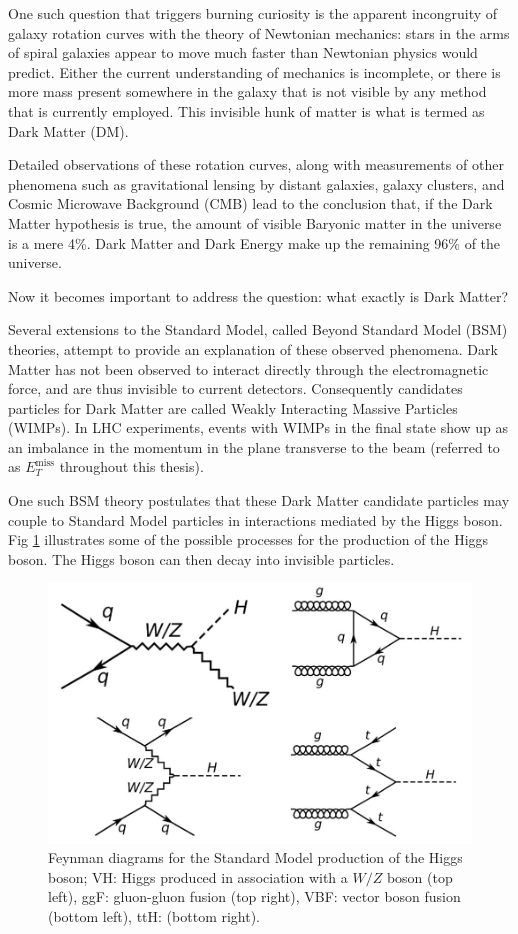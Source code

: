 \documentclass[12pt,a4paper,openright,twoside]{report}
\newcommand{\met}{$E_T^{\mathrm{miss}}$ }
\begin{document}
One such question that triggers burning curiosity is the apparent incongruity of galaxy rotation curves with the theory of Newtonian mechanics: stars in the arms of spiral galaxies appear to move much faster than Newtonian physics would predict. Either the current understanding of mechanics is incomplete, or there is more mass present somewhere in the galaxy that is not visible by any method that is currently employed. This invisible hunk of matter is what is termed as Dark Matter (DM).

Detailed observations of these rotation curves, along with measurements of other phenomena such as gravitational lensing by distant galaxies, galaxy clusters, and Cosmic Microwave Background (CMB) lead to the conclusion that, if the Dark Matter hypothesis is true, the amount of visible Baryonic matter in the universe is a mere 4\%. Dark Matter and Dark Energy make up the remaining 96\% of the universe.

Now it becomes important to address the question: what exactly is Dark Matter? 

Several extensions to the Standard Model, called Beyond Standard Model (BSM) theories, attempt to provide an explanation of these observed phenomena. Dark Matter has not been observed to interact directly through the electromagnetic force, and are thus invisible to current detectors. Consequently candidates particles for Dark Matter are called Weakly Interacting Massive Particles (WIMPs). In LHC experiments, events with WIMPs in the final state show up as an imbalance in the momentum in the plane transverse to the beam (referred to as \met throughout this thesis).

One such BSM theory postulates that these Dark Matter candidate particles may couple to Standard Model particles in interactions mediated by the Higgs boson. Fig \ref{fig:higgs} illustrates some of the possible processes for the production of the Higgs boson. The Higgs boson can then decay into invisible particles.

\begin{figure}[H]
\centering
\includegraphics[width=0.5\linewidth]{higgs_production.png}
\caption{Feynman diagrams for the Standard Model production of the Higgs boson; VH: Higgs produced in association with a $W/Z$ boson (top left), ggF: gluon-gluon fusion (top right), VBF: vector boson fusion (bottom left), ttH: (bottom right).}
\label{fig:higgs}
\end{figure}
\end{document}
